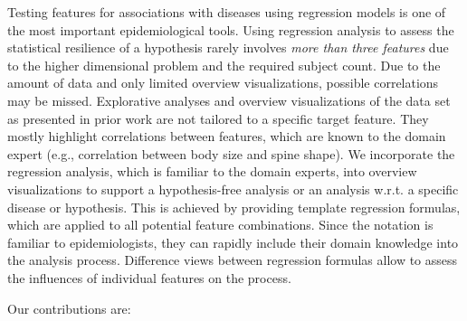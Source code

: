 \documentclass[journal]{style/vgtc} 			          %
\begin{document}
Testing features for associations with diseases using regression models is one of the most important epidemiological tools.
Using regression analysis to assess the statistical resilience of a hypothesis rarely involves \emph{more than three features} due to the higher dimensional problem and the required subject count.
Due to the amount of data and only limited overview visualizations, possible correlations may be missed.
Explorative analyses and overview visualizations of the data set as presented in prior work \cite{Klemm2014VIS} are not tailored to a specific target feature.
They mostly highlight correlations between features, which are known to the domain expert (e.g., correlation between body size and spine shape).
We incorporate the regression analysis, which is familiar to the domain experts, into overview visualizations to support a hypothesis-free analysis or an analysis w.r.t. a specific disease or hypothesis.
This is achieved by providing template regression formulas, which are applied to all potential feature combinations.
Since the notation is familiar to epidemiologists, they can rapidly include their domain knowledge into the analysis process.
Difference views between regression formulas allow to assess the influences of individual features on the process.

Our contributions are:
\end{document}
